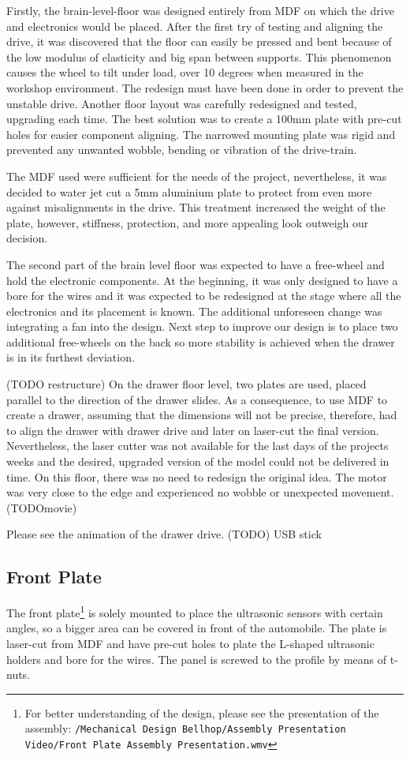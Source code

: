 \documentclass[11pt]{article}
\begin{document}
Firstly, the brain-level-floor was designed entirely from MDF on which the drive and electronics would be placed. After the first try of testing and aligning the drive, it was discovered that the floor can easily be pressed and bent because of the low modulus of elasticity and big span between supports. This phenomenon causes the wheel to tilt under load, over 10 degrees when measured in the workshop environment. The redesign must have been done in order to prevent the unstable drive. Another floor layout was carefully redesigned and tested, upgrading each time. The best solution was to create a 100mm plate with pre-cut holes for easier component aligning. The narrowed mounting plate was rigid and prevented any unwanted wobble, bending or vibration of the drive-train.


The MDF used were sufficient for the needs of the project, nevertheless, it was decided to water jet cut a 5mm aluminium plate to protect from even more against misalignments in the drive. This treatment increased the weight of the plate, however, stiffness, protection, and more appealing look outweigh our decision.


The second part of the brain level floor was expected to have a free-wheel and hold the electronic components. At the beginning, it was only designed to have a bore for the wires and it was expected to be redesigned at the stage where all the electronics and its placement is known. The additional unforeseen change was integrating a fan into the design. Next step to improve our design is to place two additional free-wheels on the back so more stability is achieved when the drawer is in its furthest deviation.


(TODO restructure) On the drawer floor level, two plates are used, placed parallel to the direction of the drawer slides. As a consequence, to use MDF to create a drawer, assuming that the dimensions will not be precise, therefore,  had to align the drawer with drawer drive and later on laser-cut the final version. Nevertheless, the laser cutter was not available for the last days of the projects weeks and the desired, upgraded version of the model could not be delivered in time. On this floor, there was no need to redesign the original idea. The motor was very close to the edge and experienced no wobble or unexpected movement. (TODOmovie)


Please see the animation of the drawer drive. (TODO)
USB stick


\subsection*{Front Plate}
The front plate\footnote{For better understanding of the design, please see the presentation of the assembly: \texttt{/Mechanical Design Bellhop/Assembly Presentation Video/Front Plate Assembly Presentation.wmv}} is solely mounted to place the ultrasonic sensors with certain angles, so a bigger area can be covered in front of the automobile. The plate is laser-cut from MDF and have pre-cut holes to plate the L-shaped ultrasonic holders and bore for the wires. The panel is screwed to the profile by means of t-nuts. 
\end{document}
